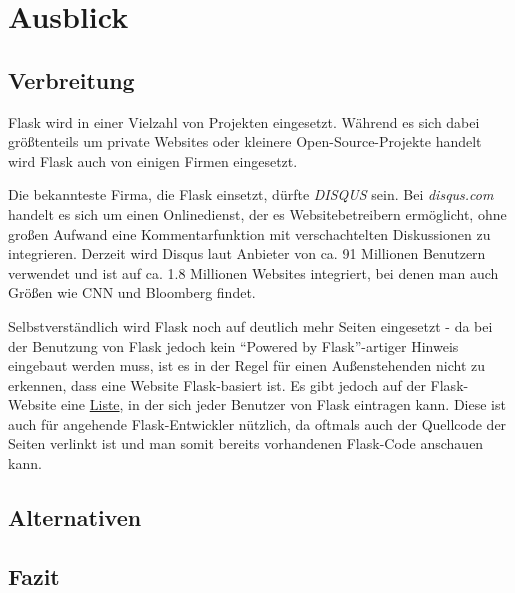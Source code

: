 \chapter{Ausblick}

\section{Verbreitung}
Flask wird in einer Vielzahl von Projekten eingesetzt. Während es sich dabei größtenteils um private
Websites oder kleinere Open-Source-Projekte handelt wird Flask auch von einigen Firmen eingesetzt.

Die bekannteste Firma, die Flask einsetzt, dürfte \emph{DISQUS} sein. Bei \emph{disqus.com} handelt
es sich um einen Onlinedienst, der es Websitebetreibern ermöglicht, ohne großen Aufwand eine
Kommentarfunktion mit verschachtelten Diskussionen zu integrieren. Derzeit wird Disqus laut Anbieter
von ca. 91 Millionen Benutzern verwendet und ist auf ca. 1.8 Millionen Websites integriert, bei
denen man auch Größen wie CNN und Bloomberg findet.


Selbstverständlich wird Flask noch auf deutlich mehr Seiten eingesetzt - da bei der Benutzung von
Flask jedoch kein \enquote{Powered by Flask}-artiger Hinweis eingebaut werden muss, ist es in der
Regel für einen Außenstehenden nicht zu erkennen, dass eine Website Flask-basiert ist. Es gibt
jedoch auf der Flask-Website eine \href{http://flask.pocoo.org/community/poweredby/}{Liste}, in der
sich jeder Benutzer von Flask eintragen kann. Diese ist auch für angehende Flask-Entwickler
nützlich, da oftmals auch der Quellcode der Seiten verlinkt ist und man somit bereits vorhandenen
Flask-Code anschauen kann.

\section{Alternativen}

\section{Fazit}
